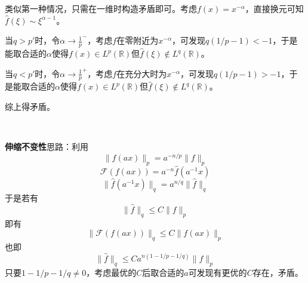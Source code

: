 \documentclass[a4paper,UTF8,fontset=windows]{ctexart}
\begin{document}
\begin{enumerate}
\begin{itemize}
        类似第一种情况，只需在一维时构造矛盾即可。考虑$f(x)=x^{-\alpha}$，直接换元可知$\hat{f}(\xi)\sim\xi^{\alpha-1}$。

        当$q>p'$时，令$\alpha\to\frac{1}{p}^-$，考虑$f$在零附近为$x^{-\alpha}$，可发现$q(1/p-1)<-1$，于是能取合适的$\alpha$使得$f(x)\in L^p(\mathbb{R})$但$\hat{f}(\xi)\notin L^q(\mathbb{R})$。

        当$q<p'$时，令$\alpha\to\frac{1}{p}^+$，考虑$f$在充分大时为$x^{-\alpha}$，可发现$q(1/p-1)>-1$，于是能取合适的$\alpha$使得$f(x)\in L^p(\mathbb{R})$但$\hat{f}(\xi)\notin L^q(\mathbb{R})$。

        综上得矛盾。
    \end{itemize}

    \

    \textbf{伸缩不变性}思路：利用
    $$\|f(ax)\|_p=a^{-n/p}\|f\|_p$$
    $$\mathcal{F}(f(ax))=a^{-n}\hat{f}(a^{-1}x)$$
    $$\|\hat{f}(a^{-1}x)\|_q=a^{n/q}\|\hat{f}\|_q$$
    于是若有
    $$\|\hat{f}\|_q\le C\|f\|_p$$
    即有
    $$\|\mathcal{F}(f(ax))\|_q\le C\|f(ax)\|_p$$
    也即
    $$\|\hat{f}\|_q\le Ca^{n(1-1/p-1/q)}\|f\|_p$$
    只要$1-1/p-1/q\ne0$，考虑最优的$C$后取合适的$a$可发现有更优的$C$存在，矛盾。
\end{enumerate}
\end{document}
